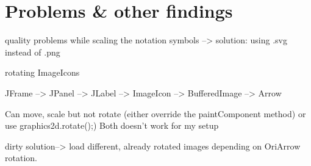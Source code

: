 
\section{Problems \& other findings}
\label{sec:problems}


quality problems while scaling the notation symbols --> solution: using .svg instead of .png

rotating ImageIcons

JFrame --> JPanel --> JLabel --> ImageIcon --> BufferedImage --> Arrow

Can move, scale but not rotate (either override the paintComponent method) or use graphics2d.rotate();)
Both doesn't work for my setup

dirty solution--> load different, already rotated images depending on OriArrow rotation.